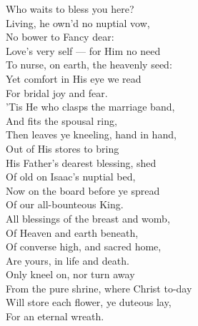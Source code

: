  Who waits to bless you here? \\
 Living, he own’d no nuptial vow, \\
 No bower to Fancy dear: \\
 Love’s very self — for Him no need \\
 To nurse, on earth, the heavenly seed: \\
 Yet comfort in His eye we read \\
 For bridal joy and fear. \\
  ’Tis He who clasps the marriage band, \\
 And fits the spousal ring, \\
 Then leaves ye kneeling, hand in hand, \\
 Out of His stores to bring \\
 His Father’s dearest blessing, shed \\
 Of old on Isaac’s nuptial bed, \\
 Now on the board before ye spread \\
 Of our all-bounteous King. \\
  All blessings of the breast and womb, \\
 Of Heaven and earth beneath, \\
 Of converse high, and sacred home, \\
 Are yours, in life and death. \\
 Only kneel on, nor turn away \\
 From the pure shrine, where Christ to-day \\
 Will store each flower, ye duteous lay, \\
 For an eternal wreath.\\


